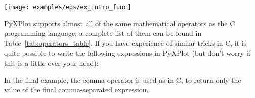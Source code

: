 \begin{center}
\texttt{[image: examples/eps/ex\_intro\_func]}
\end{center}

PyXPlot supports almost all of the same mathematical operators as the C
programming language; a complete list of them can be found in
Table~\ref{tab:operators_table}.
If you have experience of similar tricks in C, it is quite possible to write
the following expressions in PyXPlot (but don't worry if this is a little over
your head):

\vspace{3mm}

\vspace{3mm}

\noindent In the final example, the comma operator is used as in C, to return
only the value of the final comma-separated expression.

